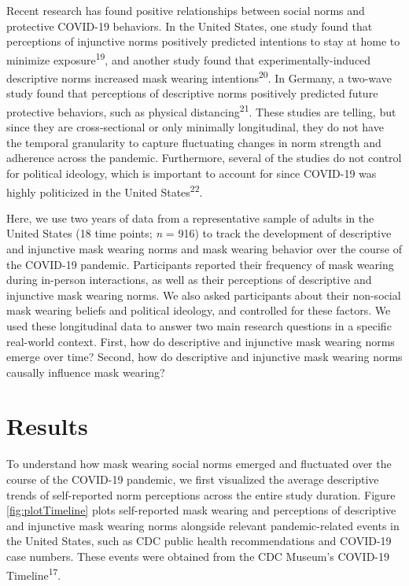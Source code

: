 \documentclass[
  man, donotrepeattitle,floatsintext]{apa6}
\begin{document}
Recent research has found positive relationships between social norms and protective COVID-19 behaviors. In the United States, one study found that perceptions of injunctive norms positively predicted intentions to stay at home to minimize exposure\textsuperscript{19}, and another study found that experimentally-induced descriptive norms increased mask wearing intentions\textsuperscript{20}. In Germany, a two-wave study found that perceptions of descriptive norms positively predicted future protective behaviors, such as physical distancing\textsuperscript{21}. These studies are telling, but since they are cross-sectional or only minimally longitudinal, they do not have the temporal granularity to capture fluctuating changes in norm strength and adherence across the pandemic. Furthermore, several of the studies do not control for political ideology, which is important to account for since COVID-19 was highly politicized in the United States\textsuperscript{22}.

Here, we use two years of data from a representative sample of adults in the United States (18 time points; \emph{n} = 916) to track the development of descriptive and injunctive mask wearing norms and mask wearing behavior over the course of the COVID-19 pandemic. Participants reported their frequency of mask wearing during in-person interactions, as well as their perceptions of descriptive and injunctive mask wearing norms. We also asked participants about their non-social mask wearing beliefs and political ideology, and controlled for these factors. We used these longitudinal data to answer two main research questions in a specific real-world context. First, how do descriptive and injunctive mask wearing norms emerge over time? Second, how do descriptive and injunctive mask wearing norms causally influence mask wearing?

\hypertarget{results}{%
\section{Results}\label{results}}

To understand how mask wearing social norms emerged and fluctuated over the course of the COVID-19 pandemic, we first visualized the average descriptive trends of self-reported norm perceptions across the entire study duration. Figure \ref{fig:plotTimeline} plots self-reported mask wearing and perceptions of descriptive and injunctive mask wearing norms alongside relevant pandemic-related events in the United States, such as CDC public health recommendations and COVID-19 case numbers. These events were obtained from the CDC Museum's COVID-19 Timeline\textsuperscript{17}.
\end{document}
